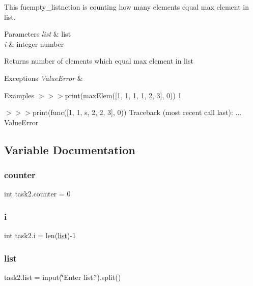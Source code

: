 This fuempty\+\_\+listnction is counting how many elements equal max element in list. 


\begin{DoxyParams}{Parameters}
{\em list} & list \\
\hline
{\em i} & integer number \\
\hline
\end{DoxyParams}
\begin{DoxyReturn}{Returns}
number of elements which equal max element in list
\end{DoxyReturn}

\begin{DoxyExceptions}{Exceptions}
{\em Value\+Error} & \\
\hline
\end{DoxyExceptions}
\begin{DoxyParagraph}{Examples}
$>$$>$$>$print(max\+Elem(\mbox{[}1, 1, 1, 1, 2, 3\mbox{]}, 0)) 1 
\end{DoxyParagraph}
\begin{DoxyParagraph}{}
$>$$>$$>$print(func(\mbox{[}1, 1, s, 2, 2, 3\mbox{]}, 0)) Traceback (most recent call last)\+: ... Value\+Error 
\end{DoxyParagraph}


\subsection{Variable Documentation}
\mbox{\label{namespacetask2_ab0a969fcb76bbf76f7af5de61e8b0698}} 
\subsubsection{\texorpdfstring{counter}{counter}}
{\footnotesize\ttfamily int task2.\+counter = 0}

\mbox{\label{namespacetask2_ae7d6bf87558b9265d2bafe30522a356e}} 
\subsubsection{\texorpdfstring{i}{i}}
{\footnotesize\ttfamily int task2.\+i = len(\hyperlink{namespacetask2_a94c38e538a456d94f6e14ef3b773a659}{list})-\/1}

\mbox{\label{namespacetask2_a94c38e538a456d94f6e14ef3b773a659}} 
\subsubsection{\texorpdfstring{list}{list}}
{\footnotesize\ttfamily task2.\+list = input(\char`\"{}Enter list\+:\char`\"{}).split()}

